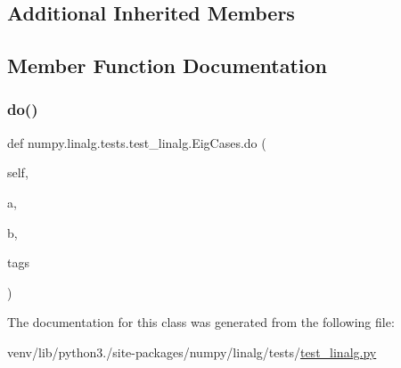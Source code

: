 \subsection*{Additional Inherited Members}


\subsection{Member Function Documentation}
\mbox{\label{classnumpy_1_1linalg_1_1tests_1_1test__linalg_1_1EigCases_a913f87275e4b7f3ce4183839f465f637}} 
\subsubsection{\texorpdfstring{do()}{do()}}
{\footnotesize\ttfamily def numpy.\+linalg.\+tests.\+test\+\_\+linalg.\+Eig\+Cases.\+do (\begin{DoxyParamCaption}\item[{}]{self,  }\item[{}]{a,  }\item[{}]{b,  }\item[{}]{tags }\end{DoxyParamCaption})}



The documentation for this class was generated from the following file\+:\begin{DoxyCompactItemize}
\item 
venv/lib/python3./site-\/packages/numpy/linalg/tests/\hyperlink{test__linalg_8py}{test\+\_\+linalg.\+py}\end{DoxyCompactItemize}
